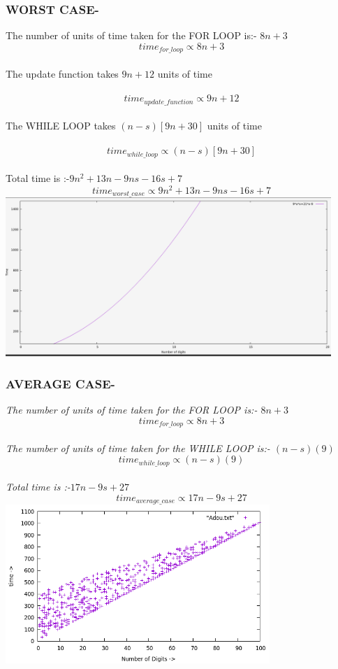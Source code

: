 \documentclass[conference]{IEEEtran}
\begin{document}
\subsubsection{\textbf{WORST CASE-}}
The number of units of time taken for the FOR LOOP is:- $8n+3$
\\ $$time_{for\_loop} \propto 8n+3$$
\\The update function takes $9n+12$ units of time
\\\\ $$time_{update\_function} \propto 9n+12$$
\\The WHILE LOOP takes $(n-s)[9n+30]$ units of time
\\\\ $$time_{while\_loop} \propto (n-s)[9n+30]$$
\\ Total time is :-$9n^2 + 13n -9ns - 16s +7$
\\$$time_{worst\_case} \propto 9n^2 + 13n -9ns - 16s +7$$
\includegraphics[height =  6.00cm,width = \linewidth]{worstcase.png}
\subsubsection{\textbf{AVERAGE CASE-}}
\textit{The number of units of time taken for the FOR LOOP is:- $8n+3$
\\ $$time_{for\_loop} \propto 8n+3$$
\\The number of units of time taken for the WHILE LOOP is:- $(n-s)(9)$
\\ $$time_{while\_loop} \propto (n-s)(9)$$
\\ Total time is :-$17n-9s+27$
\\ $$time_{average\_case} \propto 17n-9s+27$$}
\includegraphics[height =  6.00cm,width = \linewidth]{averagecase_png.png}
\end{document}
